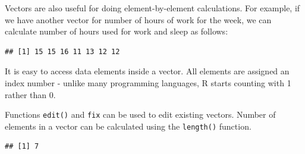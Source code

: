 \documentclass[10pt, letterpaper, twoside]{memoir}\usepackage{knitr}
\begin{document}
Vectors are also useful for doing element-by-element calculations. For example, if we have another vector for number of hours of work for the week, we can calculate number of hours used for work and sleep as follows:

\begin{knitrout}
\color{fgcolor}\begin{kframe}
\begin{alltt}
 \hlkwb{<-} \hlstd{(}\hlstd{,} \hlstd{,} \hlstd{,} \hlstd{,} \hlstd{,} \hlstd{,} \hlstd{)}  
 \hlkwb{<-}  \hlopt{+} 
  
\end{alltt}
\begin{verbatim}
## [1] 15 15 16 11 13 12 12
\end{verbatim}
\end{kframe}
\end{knitrout}

It is easy to access data elements inside a vector. All elements are assigned an index number - unlike many programming languages, R starts counting with 1 rather than 0. 

\begin{knitrout}
\color{fgcolor}\begin{kframe}
\begin{alltt}
 \hlkwb{<-} \hlstd{work.per.day[}\hlstd{]}  
\hlstd{work.per.day[}\hlstd{]} \hlkwb{<-}   
\end{alltt}
\end{kframe}
\end{knitrout}

Functions \texttt{edit()} and \texttt{fix} can be used to edit existing vectors. Number of elements in a vector can be calculated using the \texttt{length()} function.
\begin{knitrout}
\color{fgcolor}\begin{kframe}
\begin{alltt}
\end{alltt}
\begin{verbatim}
## [1] 7
\end{verbatim}
\end{kframe}
\end{knitrout}
\end{document}
